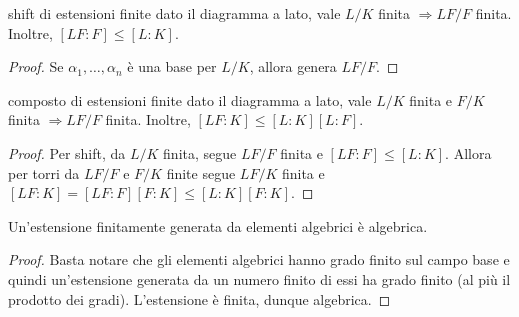\begin{minipage}{0.7\textwidth}
\begin{theorem}{shift di estensioni finite}
    dato il diagramma a lato, vale $L/K$ finita $\Rightarrow LF/F$ finita. Inoltre,  $[LF : F] \leq  [L:K]$.
\end{theorem}
\begin{proof}
    Se $\alpha_1,\dots, \alpha_n$ è una base per $L/K$, allora genera $LF/F$.
\end{proof}
\end{minipage}\hfill
\begin{minipage}{0.3\textwidth}  
\end{minipage}\hfill
\begin{minipage}{0.7\textwidth}
\begin{theorem}{composto di estensioni finite}
    dato il diagramma a lato, vale $L/K$ finita  e $F/K$ finita $\Rightarrow LF/F$ finita. Inoltre, $[LF : K] \leq [L:K][L:F]$.
\end{theorem}
\begin{proof}
    Per shift, da $L/K$ finita, segue $LF/F$ finita e $[LF:F]\leq [L:K]$. Allora per torri da $LF/F$ e $F/K$ finite segue $LF/K$ finita e $[LF:K] = [LF:F][F:K] \leq [L:K][F:K]$.
\end{proof}
\end{minipage}\hfill
\begin{minipage}{0.3\textwidth}  
\end{minipage}\hfill

\vspace{0.5cm}

\begin{proposition2}
    Un'estensione finitamente generata da elementi algebrici è algebrica.
\end{proposition2}
\begin{proof}
    Basta notare che gli elementi algebrici hanno grado finito sul campo base e quindi un'estensione generata da un numero finito di essi ha grado finito (al più il prodotto dei gradi). L'estensione è finita, dunque algebrica.
\end{proof}

